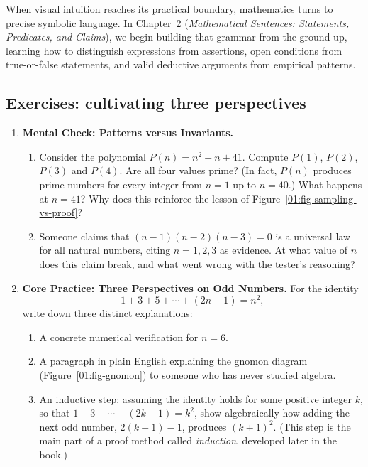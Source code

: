 When visual intuition reaches its practical boundary, mathematics turns to precise symbolic language. In Chapter~2 (\emph{Mathematical Sentences: Statements, Predicates, and Claims}), we begin building that grammar from the ground up, learning how to distinguish expressions from assertions, open conditions from true-or-false statements, and valid deductive arguments from empirical patterns.

\subsection{Exercises: cultivating three perspectives}

\begin{enumerate}[label=\textbf{\arabic*.}]
\item \textbf{Mental Check: Patterns versus Invariants.}
\begin{enumerate}[label=(\alph*)]
\item Consider the polynomial $P(n) = n^2 - n + 41$. Compute $P(1)$, $P(2)$, $P(3)$ and $P(4)$. Are all four values prime? (In fact, $P(n)$ produces prime numbers for every integer from $n = 1$ up to $n = 40$.) What happens at $n = 41$? Why does this reinforce the lesson of Figure~\ref{01:fig-sampling-vs-proof}?
\item Someone claims that $(n-1)(n-2)(n-3) = 0$ is a universal law for all natural numbers, citing $n = 1, 2, 3$ as evidence. At what value of $n$ does this claim break, and what went wrong with the tester's reasoning?
\end{enumerate}

\item \textbf{Core Practice: Three Perspectives on Odd Numbers.}
For the identity
\[
1 + 3 + 5 + \cdots + (2n-1) = n^2,
\]
write down three distinct explanations:
\begin{enumerate}[label=(\alph*)]
\item A concrete numerical verification for $n = 6$.
\item A paragraph in plain English explaining the gnomon diagram (Figure~\ref{01:fig-gnomon}) to someone who has never studied algebra.
\item An inductive step: assuming the identity holds for some positive integer $k$, so that $1 + 3 + \cdots + (2k-1) = k^2$, show algebraically how adding the next odd number, $2(k+1) - 1$, produces $(k+1)^2$. (This step is the main part of a proof method called \emph{induction}, developed later in the book.)
\end{enumerate}


\end{enumerate}
